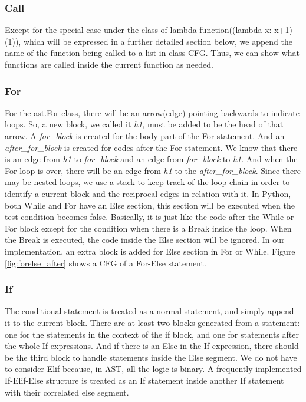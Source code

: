 \documentclass[11pt]{article}
\begin{document}
\subsubsection{Call}
Except for the special case under the class of lambda function((lambda x: x+1)(1)), which will be expressed in a further detailed section below, we append the name of the function being called to a list in class CFG. Thus, we can show what functions are called inside the current function as needed.

\subsubsection{For}
For the ast.For class, there will be an arrow(edge) pointing backwards to indicate loops. So, a new block, we called it \textit{h1}, must be added to be the head of that arrow. A \textit{for\_block} is created for the body part of the For statement. And an \textit{after\_for\_block} is created for codes after the For statement. We know that there is an edge from \textit{h1} to \textit{for\_block} and an edge from \textit{for\_block} to \textit{h1}. And when the For loop is over, there will be an edge from \textit{h1} to the \textit{after\_for\_block}. Since there may be nested loops, we use a stack to keep track of the loop chain in order to identify a current block and the reciprocal edges in relation with it. In Python, both While and For have an Else section, this section will be executed when the test condition becomes false. Basically, it is just like the code after the While or For block except for the condition when there is a Break inside the loop. When the Break is executed, the code inside the Else section will be ignored. In our implementation, an extra block is added for Else section in For or While. Figure \ref{fig:forelse_after} shows a CFG of a For-Else statement. 

\subsubsection{If}
The conditional statement is treated as a normal statement, and simply append it to the current block. There are at least two blocks generated from a statement: one for the statements in the context of the if block, and one for statements after the whole If expressions. And if there is an Else in the If expression, there should be the third block to handle statements inside the Else segment. We do not have to consider Elif because, in AST, all the logic is binary. A frequently implemented If-Elif-Else structure is treated as an If statement inside another If statement with their correlated else segment.
\end{document}
